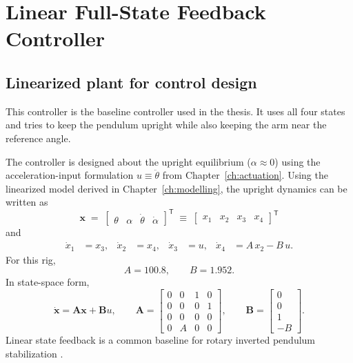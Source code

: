 \chapter{Linear Full-State Feedback Controller}
\label{ch:lin}

\section{Linearized plant for control design}
This controller is the baseline controller used in the thesis. It uses all four states and tries to keep the pendulum upright while also keeping the arm near the reference angle.

The controller is designed about the upright equilibrium ($\alpha \approx 0$) using the acceleration-input formulation $u \equiv \ddot{\theta}$ from Chapter~\ref{ch:actuation}. Using the linearized model derived in Chapter~\ref{ch:modelling}, the upright dynamics can be written as
\[
\mathbf{x} \;=\; \begin{bmatrix}\theta & \alpha & \dot{\theta} & \dot{\alpha}\end{bmatrix}^{\mathsf{T}}
\;\equiv\; \begin{bmatrix}x_1 & x_2 & x_3 & x_4\end{bmatrix}^{\mathsf{T}}
\]
and
\begin{align}
\dot{x}_1 &= x_3, &
\dot{x}_2 &= x_4, &
\dot{x}_3 &= u, &
\dot{x}_4 &= A\,x_2 - B\,u.
\label{eq:lin_plant}
\end{align}
For this rig,
\[
A = 100.8,\qquad B = 1.952.
\]
In state-space form,
\[
\dot{\mathbf{x}} = \mathbf{A}\mathbf{x} + \mathbf{B}u,\qquad
\mathbf{A}=
\begin{bmatrix}
0&0&1&0\\
0&0&0&1\\
0&0&0&0\\
0&A&0&0
\end{bmatrix},\qquad
\mathbf{B}=
\begin{bmatrix}
0\\0\\1\\-B
\end{bmatrix}.
\]
Linear state feedback is a common baseline for rotary inverted pendulum stabilization \cite{Park2011,Chawla2018}.

